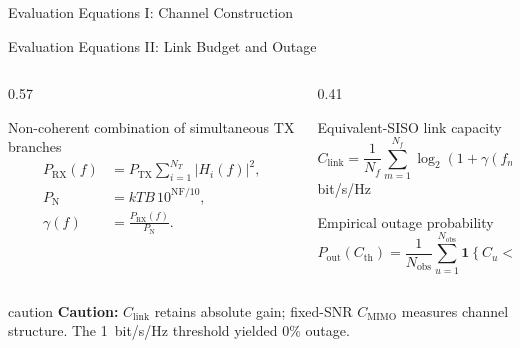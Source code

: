 \begin{frame}[t]{Evaluation Equations I: Channel Construction}
\end{frame}


\begin{frame}[t]{Evaluation Equations II: Link Budget and Outage}
  \footnotesize
  \begin{columns}[T,onlytextwidth]
    \begin{column}{0.57\textwidth}
      \begin{block}{Non-coherent combination of simultaneous TX branches}
        \begin{align*}
          P_{\mathrm{RX}}(f)
            &=P_{\mathrm{TX}}\sum_{i=1}^{N_T}|H_i(f)|^2,\\
          P_{\mathrm N}
            &=kTB\,10^{\mathrm{NF}/10},\\
          \gamma(f)
            &=\frac{P_{\mathrm{RX}}(f)}{P_{\mathrm N}}.
        \end{align*}
      \end{block}
    \end{column}

    \begin{column}{0.41\textwidth}
      \begin{block}{Equivalent-SISO link capacity}
        \begin{equation*}
          C_{\mathrm{link}}
          =\frac{1}{N_f}\sum_{m=1}^{N_f}
          \log_2\!\left(1+\gamma(f_m)\right)
        \end{equation*}
        \centering\scriptsize bit/s/Hz
      \end{block}

      \begin{block}{Empirical outage probability}
        \begin{equation*}
          P_{\mathrm{out}}(C_{\mathrm{th}})
          =\frac{1}{N_{\mathrm{obs}}}
          \sum_{u=1}^{N_{\mathrm{obs}}}
          \mathbf 1\!\left\{C_u<C_{\mathrm{th}}\right\}
        \end{equation*}
      \end{block}
    \end{column}
  \end{columns}

  \begin{beamercolorbox}[rounded=true,sep=0.4ex,wd=\linewidth]{caution}
    \scriptsize\textbf{Caution:} $C_{\mathrm{link}}$ retains absolute gain;
    fixed-SNR $C_{\mathrm{MIMO}}$ measures channel structure. The
    1~bit/s/Hz threshold yielded 0\% outage.
  \end{beamercolorbox}
\end{frame}


